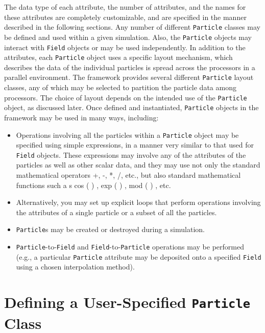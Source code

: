 The data type of each attribute, the number of attributes, and the names for these attributes are completely customizable, and are specified in the manner described in the following sections. Any number of different \texttt{Particle} classes may be defined and used within a given simulation. Also, the \texttt{Particle} objects may interact with \ippl \texttt{Field} objects or may be used independently. In addition to the attributes, each \texttt{Particle} object uses a specific layout mechanism, which describes the data of the individual particles is spread across the processors in a parallel environment. The \ippl framework provides several different \texttt{Particle} layout classes, any of which may be selected to partition the particle data among processors. The choice of layout depends on the intended use of the \texttt{Particle} object, as discussed later. Once defined and instantiated, \texttt{Particle} objects in the \ippl framework may be used in many ways, including:
\begin{itemize}
    \item Operations involving all the particles within a \texttt{Particle} object may be specified using simple expressions, in a manner very similar to that used for \texttt{Field} objects. These expressions may involve any of the attributes of the particles as well as other scalar data, and they may use not only the standard mathematical operators +, -, *, /, etc., but also standard mathematical functions such a s cos ( ) , exp ( ) , mod ( ) , etc.
    \item Alternatively, you may set up explicit loops that perform operations involving the attributes of a single particle or a subset of all the particles.
    \item \texttt{Particle}s may be created or destroyed during a simulation.
    \item \texttt{Particle}-to-\texttt{Field} and \texttt{Field}-to-\texttt{Particle} operations may be performed (e.g., a particular \texttt{Particle} attribute may be deposited onto a specified \texttt{Field} using a chosen interpolation method). 
\end{itemize}

\section{Defining a User-Specified \texttt{Particle} Class}

